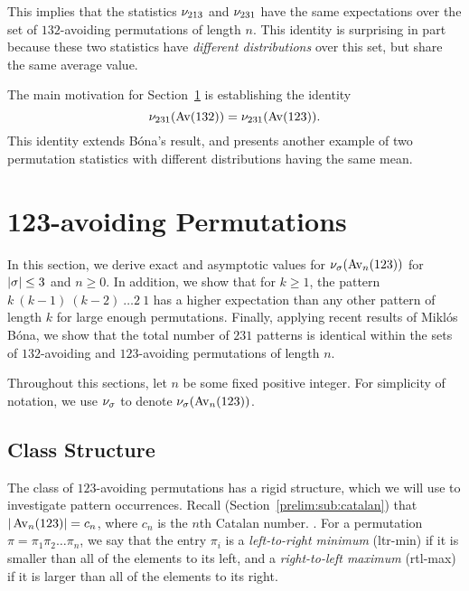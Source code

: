     This implies that the statistics  $\nu_{213}$ and
    $\nu_{231}$ have the same expectations  over the set of
    $132$-avoiding permutations of length $n$. This identity is surprising in part because
    these two statistics have \emph{different distributions} over this set, but
    share the same average value. 

    The main motivation for Section~\ref{expat:av123} is establishing the
    identity 
    $$\nu_{231}(\operatorname{{Av}}(132)) = \nu_{231}(\operatorname{{Av}}(123)).$$
    This identity extends B\'ona's result, and presents another example of two
    permutation statistics with different distributions having the same mean. 

\section{123-avoiding Permutations}
\label{expat:av123}

    In this section, we derive exact and asymptotic values for $\nu_\sigma
    (\operatorname{{Av}}_n(123))$ for $|\sigma| \leq 3$ and $n \geq 0$. In addition, we show that
    for $k \geq 1$, the pattern $k\ (k-1)\ (k-2)\ \dots 2\ 1$ has a higher
    expectation than any other pattern of length $k$ for large enough permutations. 
    Finally, applying recent results of Mikl\'os B\'ona, we show that 
    the total number of $231$ patterns is identical within the sets of
    $132$-avoiding and $123$-avoiding permutations of length $n$. 

    Throughout this sections, let $n$ be some fixed positive integer. For
    simplicity of notation, we use $\nu_\sigma$ to denote $\nu_\sigma (\operatorname{{Av}}_n(123))$. 
     
  \subsection{Class Structure}

    The class of $123$-avoiding permutations has a rigid structure, which we will
    use to investigate pattern occurrences. 
    Recall (Section~\ref{prelim:sub:catalan}) that $|\operatorname{{Av}}_n(123)| = c_n$, where $c_n$
    is the $n$th Catalan number.  .  For a permutation
    $\pi = \pi_1 \pi_2 \dots \pi_n$, we say that the entry $\pi_i$ is a
    \emph{left-to-right minimum} (ltr-min)  if it
    is smaller than all of the elements to its left, and a \emph{right-to-left
    maximum} (rtl-max)  if it is larger than all of
    the elements to its right. 
    
